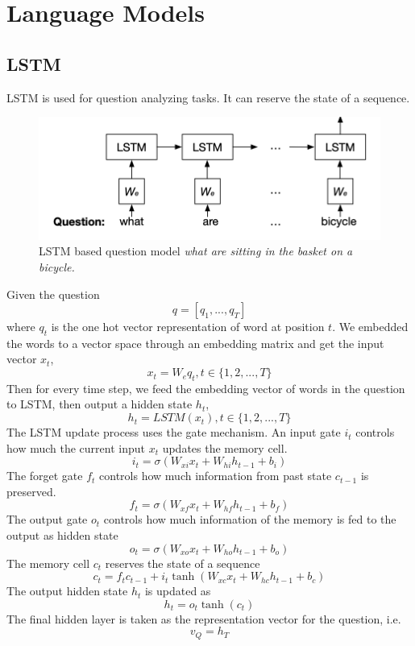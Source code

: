 \chapter{Language Models}



\section{LSTM}

LSTM is used for question analyzing tasks. It can reserve the state of a sequence.

\begin{figure}[h!]
	\centering
	\includegraphics{img/lstm-example}
	\caption{LSTM based question model \textit{what are sitting in the basket on a bicycle.} \cite{SAN}}
	\label{fig:lstm}
\end{figure}

Given the question 
\[ q =[q_1, ..., q_T] \]
where $ q_t $ is the one hot vector representation of word at position $ t $.
We embedded the words to a vector space through an embedding matrix and get the input vector $ x_t $,
\[ x_t = W_e q_t, t\in \{1,2,...,T\}\]
Then for every time step, we feed the embedding vector of words in the question to LSTM, then output a hidden state $ h_t $,
\[h_t = LSTM(x_t), t\in \{1,2,...,T\} \]
The LSTM update process uses the gate mechanism. An input gate $ i_t $ controls how much the current input $ x_t $ updates the memory cell.
\[ i_t = \sigma (W_{xi} x_t + W_{hi} h_{t-1} + b_i  ) \]
The forget gate $ f_t $ controls how much information from past state $ c_{t-1} $ is preserved.
\[f_t = \sigma (W_{xf} x_t  + W_{hf}h_{t-1} + b_f) \]
The output gate $ o_t $ controls how much information of the memory is fed to the output as hidden state
\[ o_t = \sigma ( W_{xo} x_t + W_{ho} h_{t-1} + b_o ) \]
The memory cell $ c_t $ reserves the state of a sequence
\[ c_t = f_tc_{t-1}  + i_t\tanh (W_{xc}x_t + W_{hc} h_{t-1} + b_c)  \]
The output hidden state $ h_t $ is updated as 
\[h_t = o_t\tanh(c_t)\]
The final hidden layer is taken as the representation vector for the question, i.e.
\[v_Q = h_T\]


